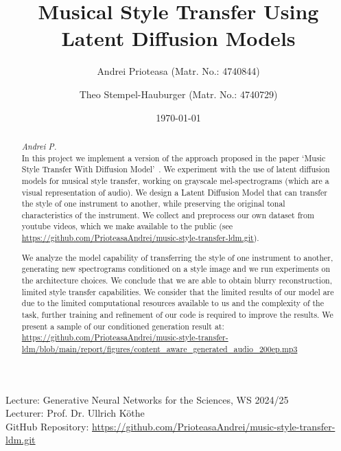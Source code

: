 \documentclass[12pt]{article}
\title{Musical Style Transfer Using Latent Diffusion Models}
\author{Andrei Prioteasa (Matr. No.: 4740844) \and Theo Stempel-Hauburger (Matr. No.: 4740729)}
\date{\today}
\newcommand{\lecturename}{Lecture: Generative Neural Networks for the Sciences, WS 2024/25}
\newcommand{\lecturer}{Lecturer: Prof. Dr. Ullrich Köthe}
\newcommand{\github}{GitHub Repository: \url{https://github.com/PrioteasaAndrei/music-style-transfer-ldm.git}}
\begin{document}
\maketitle
\begin{center}
    \lecturename \\
    \lecturer \\
    \vspace{0.5cm}
    \github
\end{center}

\tableofcontents
\begin{abstract}
    \textit{Andrei P.}\\
    \noindent In this project we implement a version of the approach proposed in the paper `Music Style Transfer With Diffusion Model'~\cite{huang2024music}. We experiment with the use of latent diffusion models for musical style transfer, working on grayscale mel-spectrograms (which are a visual representation of audio). We design a Latent Diffusion Model that can transfer the style of one instrument to another, while preserving the original tonal characteristics of the instrument. We collect and preprocess our own dataset from youtube videos, which we make available to the public (see \url{https://github.com/PrioteasaAndrei/music-style-transfer-ldm.git}). 
    
    We analyze the model capability of transferring the style of one instrument to another, generating new spectrograms conditioned on a style image and we run experiments on the architecture choices. We conclude that we are able to obtain blurry reconstruction, limited style transfer capabilities. We consider that the limited results of our model are due to the limited computational resources available to us and the complexity of the task, further training and refinement of our code is required to improve the results. We present a sample of our conditioned generation result at: \url{https://github.com/PrioteasaAndrei/music-style-transfer-ldm/blob/main/report/figures/content_aware_generated_audio_200ep.mp3}
   
\end{abstract}










\end{document}

